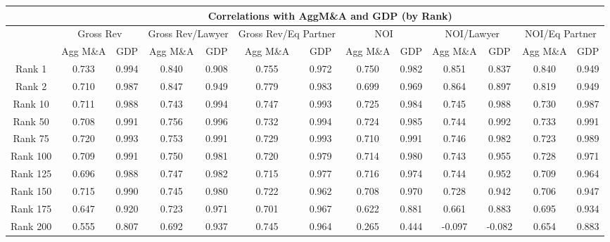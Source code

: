 \documentclass{article}
\begin{document}
                    \begin{table}[H]
\centering
\begin{tabular}{ccccccccccccc}

                    \multirow{2}{*}{} & \multicolumn{12}{c}{\textbf{Correlations with AggM\&A and GDP (by Rank)}} \\
                    \hline
                    & \multicolumn{2}{c}{Gross Rev} & \multicolumn{2}{c}{Gross Rev/Lawyer} & \multicolumn{2}{c}{Gross Rev/Eq Partner} & \multicolumn{2}{c}{NOI}& \multicolumn{2}{c}{NOI/Lawyer}& \multicolumn{2}{c}{NOI/Eq Partner}\\
                    \cline{2-13}
                    & Agg M\&A & GDP & Agg M\&A & GDP & Agg M\&A & GDP & Agg M\&A & GDP & Agg M\&A & GDP & Agg M\&A & GDP\\
                    \hline
                     
Rank 1 & 0.733 & 0.994 & 0.840 & 0.908 & 0.755 & 0.972 & 0.750 & 0.982 & 0.851 & 0.837 & 0.840 & 0.949 \\ 
  Rank 2 & 0.710 & 0.987 & 0.847 & 0.949 & 0.779 & 0.983 & 0.699 & 0.969 & 0.864 & 0.897 & 0.819 & 0.949 \\ 
  Rank 10 & 0.711 & 0.988 & 0.743 & 0.994 & 0.747 & 0.993 & 0.725 & 0.984 & 0.745 & 0.988 & 0.730 & 0.987 \\ 
  Rank 50 & 0.708 & 0.991 & 0.756 & 0.996 & 0.732 & 0.994 & 0.724 & 0.985 & 0.744 & 0.992 & 0.733 & 0.991 \\ 
  Rank 75 & 0.720 & 0.993 & 0.753 & 0.991 & 0.729 & 0.993 & 0.710 & 0.991 & 0.746 & 0.982 & 0.723 & 0.989 \\ 
  Rank 100 & 0.709 & 0.991 & 0.750 & 0.981 & 0.720 & 0.979 & 0.714 & 0.980 & 0.743 & 0.955 & 0.728 & 0.971 \\ 
  Rank 125 & 0.696 & 0.988 & 0.747 & 0.982 & 0.715 & 0.977 & 0.716 & 0.974 & 0.744 & 0.952 & 0.709 & 0.964 \\ 
  Rank 150 & 0.715 & 0.990 & 0.745 & 0.980 & 0.722 & 0.962 & 0.708 & 0.970 & 0.728 & 0.942 & 0.706 & 0.947 \\ 
  Rank 175 & 0.647 & 0.920 & 0.723 & 0.971 & 0.701 & 0.967 & 0.622 & 0.881 & 0.661 & 0.883 & 0.695 & 0.934 \\ 
  Rank 200 & 0.555 & 0.807 & 0.692 & 0.937 & 0.745 & 0.964 & 0.265 & 0.444 & -0.097 & -0.082 & 0.654 & 0.883 \\ 
   \hline
\end{tabular}
\end{table}
\end{document}
